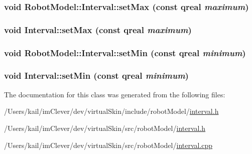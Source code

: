 \label{class_robot_model_1_1_interval_a15ffb7f16e3bad02073761ecd23d9695}
\hypertarget{class_robot_model_1_1_interval_a91f49b3d27fda4b214d599508db7bf12}{
\subsubsection[{setMax}]{\setlength{\rightskip}{0pt plus 5cm}void RobotModel::Interval::setMax (const qreal {\em maximum})}}
\label{class_robot_model_1_1_interval_a91f49b3d27fda4b214d599508db7bf12}
\hypertarget{class_robot_model_1_1_interval_a7deeccee610088a7aebef94919fd6f36}{
\subsubsection[{setMax}]{\setlength{\rightskip}{0pt plus 5cm}void Interval::setMax (const qreal {\em maximum})}}
\label{class_robot_model_1_1_interval_a7deeccee610088a7aebef94919fd6f36}
\hypertarget{class_robot_model_1_1_interval_a70965c586d4e6e9d1c8d8d103de64165}{
\subsubsection[{setMin}]{\setlength{\rightskip}{0pt plus 5cm}void RobotModel::Interval::setMin (const qreal {\em minimum})}}
\label{class_robot_model_1_1_interval_a70965c586d4e6e9d1c8d8d103de64165}
\hypertarget{class_robot_model_1_1_interval_a093471bdcba90e074543fb2781287145}{
\subsubsection[{setMin}]{\setlength{\rightskip}{0pt plus 5cm}void Interval::setMin (const qreal {\em minimum})}}
\label{class_robot_model_1_1_interval_a093471bdcba90e074543fb2781287145}


The documentation for this class was generated from the following files:\begin{DoxyCompactItemize}
\item 
/Users/kail/imClever/dev/virtualSkin/include/robotModel/\hyperlink{include_2robot_model_2interval_8h}{interval.h}\item 
/Users/kail/imClever/dev/virtualSkin/src/robotModel/\hyperlink{src_2robot_model_2interval_8h}{interval.h}\item 
/Users/kail/imClever/dev/virtualSkin/src/robotModel/\hyperlink{interval_8cpp}{interval.cpp}\end{DoxyCompactItemize}
